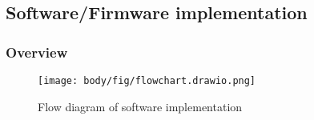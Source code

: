 


%
%
%
%


\pagebreak
\subsection{Software/Firmware implementation}
\subsubsection{Overview}

\begin{figure}[!htb]
	\centering
	\texttt{[image: body/fig/flowchart.drawio.png]}
	\caption{Flow diagram of software implementation }
	\label{fig:softwareoverview}
\end{figure}

